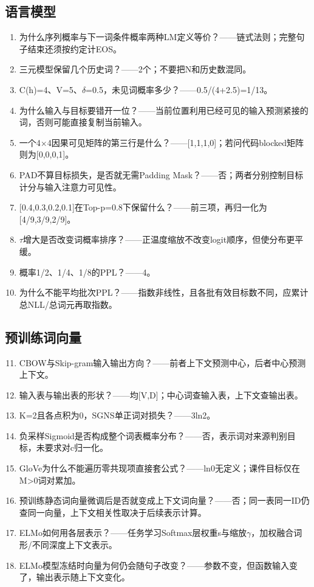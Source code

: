 \documentclass[UTF8,a4paper,zihao=-4,fontset=windows]{ctexart}
\begin{document}
\subsection*{语言模型}
\begin{enumerate}
\item {}为什么序列概率与下一词条件概率两种LM定义等价？------链式法则；完整句子结束还须按约定计EOS。
\item {}三元模型保留几个历史词？------2个；不要把N和历史数混同。
\item {}C(h)=4、V=5、\ensuremath{\delta}=0.5，未见词概率多少？------0.5/\allowbreak{}(4+2.5)=1/\allowbreak{}13。
\item {}为什么输入与目标要错开一位？------当前位置利用已经可见的输入预测紧接的词，否则可能直接复制当前输入。
\item {}一个4\ensuremath{\times}4因果可见矩阵的第三行是什么？------[1,1,1,0]；若问代码blocked矩阵则为[0,0,0,1]。
\item {}PAD不算目标损失，是否就无需Padding Mask？------否；两者分别控制目标计分与输入注意力可见性。
\item {}[0.4,0.3,0.2,0.1]在Top-p=0.8下保留什么？------前三项，再归一化为[4/\allowbreak{}9,3/\allowbreak{}9,2/\allowbreak{}9]。
\item {}\ensuremath{\tau}增大是否改变词概率排序？------正温度缩放不改变logit顺序，但使分布更平缓。
\item {}概率1/\allowbreak{}2、1/\allowbreak{}4、1/\allowbreak{}8的PPL？------4。
\item {}为什么不能平均批次PPL？------指数非线性，且各批有效目标数不同，应累计总NLL/\allowbreak{}总词元再取指数。
\end{enumerate}
\subsection*{预训练词向量}
\begin{enumerate}
\setcounter{enumi}{10}
\item {}CBOW与Skip-gram输入输出方向？------前者上下文预测中心，后者中心预测上下文。
\item {}输入表与输出表的形状？------均[V,D]；中心词查输入表，上下文查输出表。
\item {}K=2且各点积为0，SGNS单正词对损失？------3ln2。
\item {}负采样Sigmoid是否构成整个词表概率分布？------否，表示词对来源判别目标，未要求对c归一化。
\item {}GloVe为什么不能遍历零共现项直接套公式？------ln0无定义；课件目标仅在M>0词对累加。
\item {}预训练静态词向量微调后是否就变成上下文词向量？------否；同一表同一ID仍查同一向量，上下文相关性取决于后续表示计算。
\item {}ELMo如何用各层表示？------任务学习Softmax层权重s与缩放\ensuremath{\gamma}，加权融合词形/\allowbreak{}不同深度上下文表示。
\item {}ELMo模型冻结时向量为何仍会随句子改变？------参数不变，但函数输入变了，输出表示随上下文变化。
\end{enumerate}
\end{document}
